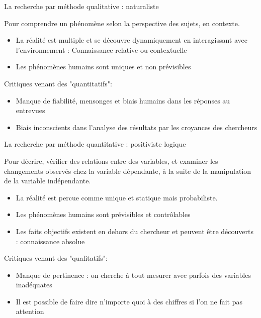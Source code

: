\documentclass[french]{beamer}
\begin{document}
\begin{frame}{La recherche par méthode qualitative : naturaliste}

Pour comprendre un phénomène selon la perspective des sujets, en contexte.
\begin{itemize}
	\item La réalité est multiple et se découvre dynamiquement en interagissant avec l'environnement : Connaissance relative ou contextuelle
	\item Les phénomènes humains sont uniques et non prévisibles
\end{itemize}
Critiques venant des "quantitatifs":
\begin{itemize}
	\item Manque de fiabilité, mensonges et biais humains dans les réponses au entrevues
	\item Biais inconscients dans l'analyse des résultats par les croyances des chercheurs
\end{itemize}
\end{frame}

\begin{frame}{La recherche par méthode quantitative : positiviste logique}

Pour décrire, vérifier des relations entre des variables, et examiner les changements observés chez la variable dépendante, à la suite de la manipulation de la variable indépendante.
\begin{itemize}
	\item La réalité est percue comme unique et statique mais probabiliste.
	\item Les phénomènes humains sont prévisibles et contrôlables
	\item Les faits objectifs existent en dehors du chercheur et peuvent être découverts : connaissance absolue
\end{itemize}
Critiques venant des "qualitatifs":
\begin{itemize}
	\item Manque de pertinence : on cherche à tout mesurer avec parfois des variables inadéquates
	\item Il est possible de faire dire n'importe quoi à des chiffres si l'on ne fait pas attention
\end{itemize}
\end{frame}
\end{document}
